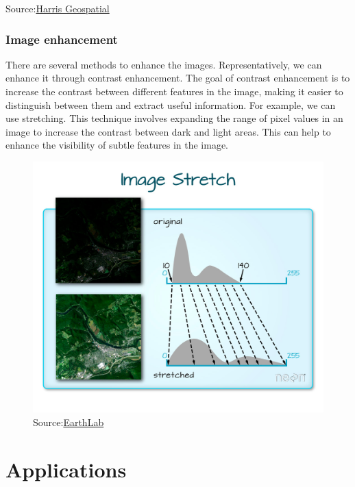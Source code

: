 \documentclass[
  letterpaper,
  DIV=11,
  numbers=noendperiod]{scrreprt}
\begin{document}
Source:\href{https://www.l3harrisgeospatial.com/docs/mosaicseamless.html}{Harris
Geospatial}

\hypertarget{image-enhancement}{%
\subsubsection{Image enhancement}\label{image-enhancement}}

There are several methods to enhance the images. Representatively, we
can enhance it through contrast enhancement. The goal of contrast
enhancement is to increase the contrast between different features in
the image, making it easier to distinguish between them and extract
useful information. For example, we can use stretching. This technique
involves expanding the range of pixel values in an image to increase the
contrast between dark and light areas. This can help to enhance the
visibility of subtle features in the image.

\begin{figure}

{\centering \includegraphics{./images/paste-F110336A.png}

}

\caption{Source:\href{https://www.earthdatascience.org/courses/use-data-open-source-python/multispectral-remote-sensing/intro-naip/}{EarthLab}}

\end{figure}

\hypertarget{applications-1}{%
\section{Applications}\label{applications-1}}
\end{document}
